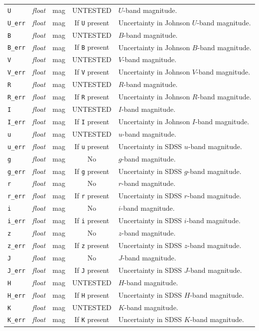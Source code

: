 \documentclass{report}
\begin{document}
\begin{center}
\begin{longtable}{lllcp{2in}}
\verb|U| & {\it float} & mag & UNTESTED & $U$-band magnitude. \\
\verb|U_err| & {\it float} & mag & If \verb|U| present & Uncertainty in Johnson $U$-band magnitude. \\
\verb|B| & {\it float} & mag & UNTESTED & $B$-band magnitude. \\
\verb|B_err| & {\it float} & mag & If \verb|B| present & Uncertainty in Johnson $B$-band magnitude. \\
\verb|V| & {\it float} & mag & UNTESTED & $V$-band magnitude. \\
\verb|V_err| & {\it float} & mag & If \verb|V| present & Uncertainty in Johnson $V$-band magnitude. \\
\verb|R| & {\it float} & mag & UNTESTED & $R$-band magnitude. \\
\verb|R_err| & {\it float} & mag & If \verb|R| present & Uncertainty in Johnson $R$-band magnitude. \\
\verb|I| & {\it float} & mag & UNTESTED & $I$-band magnitude. \\
\verb|I_err| & {\it float} & mag & If \verb|I| present & Uncertainty in Johnson $I$-band magnitude. \\
\verb|u| & {\it float} & mag & UNTESTED & $u$-band magnitude. \\
\verb|u_err| & {\it float} & mag & If \verb|u| present & Uncertainty in SDSS $u$-band magnitude. \\
\verb|g| & {\it float} & mag & No & $g$-band magnitude. \\
\verb|g_err| & {\it float} & mag & If \verb|g| present & Uncertainty in SDSS $g$-band magnitude. \\
\verb|r| & {\it float} & mag & No & $r$-band magnitude. \\
\verb|r_err| & {\it float} & mag & If \verb|r| present & Uncertainty in SDSS $r$-band magnitude. \\
\verb|i| & {\it float} & mag & No & $i$-band magnitude. \\
\verb|i_err| & {\it float} & mag & If \verb|i| present & Uncertainty in SDSS $i$-band magnitude. \\
\verb|z| & {\it float} & mag & No & $z$-band magnitude. \\
\verb|z_err| & {\it float} & mag & If \verb|z| present & Uncertainty in SDSS $z$-band magnitude. \\
\verb|J| & {\it float} & mag & No & $J$-band magnitude. \\
\verb|J_err| & {\it float} & mag & If \verb|J| present & Uncertainty in SDSS $J$-band magnitude. \\
\verb|H| & {\it float} & mag & UNTESTED & $H$-band magnitude. \\
\verb|H_err| & {\it float} & mag & If \verb|H| present & Uncertainty in SDSS $H$-band magnitude. \\
\verb|K| & {\it float} & mag & UNTESTED & $K$-band magnitude. \\
\verb|K_err| & {\it float} & mag & If \verb|K| present & Uncertainty in SDSS $K$-band magnitude. \\
\end{longtable}
\end{center}
\end{document}

